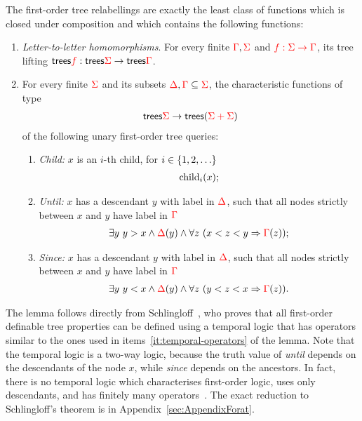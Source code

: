 \begin{lemma}\label{lem:schlingloff} The first-order tree relabellings are exactly the least class of functions which is closed under composition and which  contains the following functions:
    \begin{enumerate}
        \item \label{it:relabelling} \emph{Letter-to-letter homomorphisms}. For  every finite ${\color{red}{\Gamma}},{\color{red}{\Sigma}}$ and ${\color{red}{f : {\color{red}{\Sigma}}\to {\color{red}{\Gamma}}}}$, its tree lifting $\mathsf {trees} {\color{red}{f}} : \mathsf {trees} {\color{red}{\Sigma}} \to \mathsf {trees} {\color{red}{\Gamma}}$.
        \item \label{it:temporal-operators} For every finite  ${\color{red}{\Sigma}}$ and its subsets ${\color{red}{\Delta}}, {\color{red}{\Gamma}} \subseteq {\color{red}{\Sigma}}$, the characteristic functions of type
        \begin{align*}
            \mathsf {trees} {\color{red}{\Sigma}} \to \mathsf {trees}({\color{red}{{\color{red}{\Sigma}}+ {\color{red}{\Sigma}}}})
        \end{align*}
        of the following unary first-order tree queries:
        \begin{enumerate}
            \item \label{it:child} \emph{Child:} $x$ is an $i$-th child, for $i \in \{1,2,\ldots\}$
            \begin{align*}
            \mathrm{child}_{i} (x); 
            \end{align*}
             \item \label{it:until} \emph{Until:}  $x$ has a descendant $y$ with label in ${\color{red}{\Delta}}$, such that all nodes strictly between $x$ and $y$ have label in ${\color{red}{\Gamma}}$
             \begin{align*} 
                  \exists y\ y > x \land {\color{red}{\Delta}}(y) \land  \forall z \ (x < z < y \Rightarrow {\color{red}{\Gamma}}(z));
             \end{align*} 
             \item \label{it:since}\emph{Since:} $x$ has a descendant $y$ with label in ${\color{red}{\Delta}}$, such that all nodes strictly between $x$ and $y$ have label in ${\color{red}{\Gamma}}$
             \begin{align*}
                  \exists y\ y < x \land {\color{red}{\Delta}}(y) \land  \forall z \ (y < z < x \Rightarrow {\color{red}{\Gamma}}(z)).
             \end{align*} 
        \end{enumerate}
    \end{enumerate}
    
\end{lemma}

The  lemma follows directly from Schlingloff~\cite[Theorem 2.6]{schlingloff1992expressive}, who proves that all first-order definable tree properties can be defined using a temporal logic that has operators similar to the ones used in items~\ref{it:temporal-operators} of the lemma. Note that the temporal logic is a two-way logic, because the truth value of \emph{until} depends on the descendants of the node $x$, while \emph{since} depends on the ancestors. In fact, there is no temporal logic which characterises first-order logic, uses only descendants, and has finitely many operators~\cite[Theorem 5.5]{bojanczykWreathProductsForest2012}. 
The exact reduction to Schlingloff's theorem is  in Appendix~\ref{sec:AppendixForat}.


